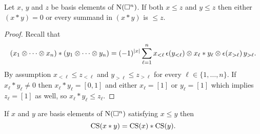 \begin{lemma}
	Let $x$, $y$ and $z$ be basis elements of $\operatorname{N}(\square^n)$.
	If both $x \leq z$ and $y \leq z$ then either $(x \ast y) = 0$ or every summand in $(x \ast y)$ is $\leq z$.
\end{lemma}

\begin{proof}
	Recall that
	\begin{multline*}
		(x_1 \otimes \cdots \otimes x_n) \ast (y_1 \otimes \cdots \otimes y_n)
		=
		(-1)^{|x|} \sum_{\ell=1}^n x_{<\ell}\, \epsilon(y_{<\ell}) \otimes x_\ell \ast y_\ell \otimes \epsilon(x_{>\ell}) \, y_{>\ell}.
	\end{multline*}
	By assumption $x_{<\ell} \leq z_{<\ell}$ and $y_{>\ell} \leq z_{>\ell}$ for every $\ell \in \{1, \dots, n\}$.
	If $x_\ell \ast y_\ell \neq 0$ then $x_\ell \ast y_\ell = [0,1]$ and either $x_\ell = [1]$ or $y_\ell = [1]$ which implies $z_\ell = [1]$ as well, so $x_\ell \ast y_\ell \leq z_\ell$.
\end{proof}

\begin{lemma}
	If $x$ and $y$ are basis elements of $\operatorname{N}(\square^n)$ satisfying $x \leq y$ then
	\begin{equation} \label{e:cs collapse as algebra map}
		\operatorname{CS}(x \ast y) = \operatorname{CS}(x) \ast \operatorname{CS}(y).
	\end{equation}
\end{lemma}

